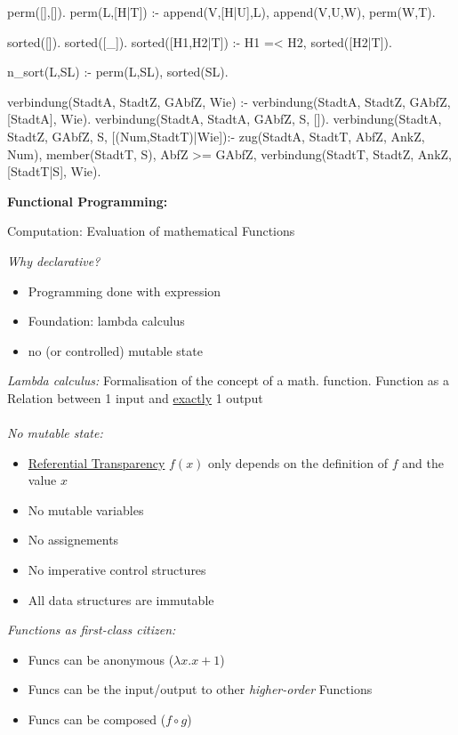 \begin{breakbox}
\begin{prologcode}
perm([],[]).
perm(L,[H|T]) :- append(V,[H|U],L), append(V,U,W), perm(W,T).


sorted([]).
sorted([_]).
sorted([H1,H2|T]) :- H1 =< H2, sorted([H2|T]).


n_sort(L,SL) :- perm(L,SL), sorted(SL).


verbindung(StadtA, StadtZ, GAbfZ, Wie) :-
verbindung(StadtA, StadtZ, GAbfZ, [StadtA], Wie). %
verbindung(StadtA, StadtA, GAbfZ, S, []). %
verbindung(StadtA, StadtZ, GAbfZ, S, [(Num,StadtT)|Wie]):-
zug(StadtA, StadtT, AbfZ, AnkZ, Num),
\+ member(StadtT, S),
AbfZ >= GAbfZ,
verbindung(StadtT, StadtZ, AnkZ, [StadtT|S], Wie).
\end{prologcode}
\end{breakbox}

\begin{breakbox}
\textbf{Functional Programming:}
\begin{mdframed}
  \begin{center}
  	Computation: Evaluation of mathematical Functions
  \end{center}
\end{mdframed}
\emph{Why declarative?}
\begin{itemize}
	\item Programming done with expression
	\item Foundation: lambda calculus
	\item no (or controlled) mutable state
\end{itemize}
\emph{Lambda calculus:} Formalisation of the concept of a math. function. Function as a Relation between 1 input and \underline{exactly} 1 output \\\\
\emph{No mutable state:}
\begin{itemize}
	\item \underline{Referential Transparency} $f(x)$ only depends on the definition of $f$ and the value $x$
	\item No mutable variables
	\item No assignements
	\item No imperative control structures
	\item All data structures are immutable\\
\end{itemize}
\emph{Functions as first-class citizen:}
\begin{itemize}
	\item Funcs can be anonymous ($\lambda x.x+1$)
	\item Funcs can be the input/output to other \emph{higher-order} Functions
	\item Funcs can be composed ($f \circ g$)
\end{itemize}
\end{breakbox}

